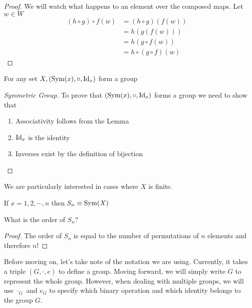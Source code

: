 \documentclass{article}
\begin{document}
\begin{proof}
    We will watch what happens to an element over the composed maps. Let $w \in W$
    \begin{align*}
        (h \circ g) \circ f (w) &= (h \circ g)(f(w)) \\
        &= h(g(f(w))) \\
        &= h(g \circ f(w)) \\
        &= h \circ (g \circ f)(w)
    \end{align*}
\end{proof}

\begin{prop}
    For any set $X, (\operatorname{Sym}(x), \circ, \mathrm{Id}_x)$ form a group
\end{prop}

\begin{proof}[Symmetric Group]
    To prove that $(\operatorname{Sym}(x), \circ, \mathrm{Id}_x)$ forms a group we need to show that
    \begin{enumerate}
        \item Associativity follows from the Lemma
        \item $\mathrm{Id}_x$ is the identity
        \item Inverses exist by the definition of bijection
    \end{enumerate}
\end{proof}

We are particularly interested in cases where $X$ is finite.
\begin{defi}[$S_n$]
    If $x = {1, 2, \cdots, n}$ then $S_n \equiv \operatorname{Sym}(X)$
\end{defi}

\begin{ex}
    What is the order of $S_n$?
\end{ex}

\begin{proof}
    The order of $S_n$ is equal to the number of permutations of $n$ elements and therefore $n!$
\end{proof}

\begin{remark}
    Before moving on, let's take note of the notation we are using. Currently, it takes a triple $(G, \cdot, e)$ to define a group. Moving forward, we will simply write $G$ to represent the whole group. However, when dealing with multiple groups, we will use $\cdot_G$ and $e_G$ to specify which binary operation and which identity belongs to the group $G$.
\end{remark}
\end{document}
